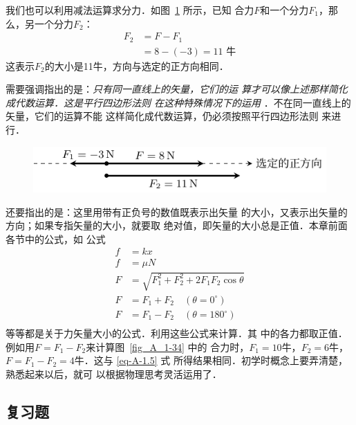     我们也可以利用减法运算求分力．如图~\ref{fig_A_1-35} 所示，已知
合力$F$和一个分力$F_1$，那么，另一个分力$F_2$：
\begin{equation} 
\begin{split} 
F_2&=F-F_1\\
&=8-(-3)=11\text{ 牛} 
\end{split} 
\end{equation} 
这表示$F_2$的大小是11牛，方向与选定的正方向相同．

需要强调指出的是：\textit{只有同一直线上的矢量，它们的运
算才可以像上述那样简化成代数运算．这是平行四边形法则
在这种特殊情况下的运用} ．不在同一直线上的矢量，它们的运算不能
这样简化成代数运算，仍必须按照平行四边形法则
来进行．

\begin{figure} [htp]
\centering
\includegraphics{fig/A/1-35.pdf} 
\caption{} \label{fig_A_1-35} 
\end{figure} 

    还要指出的是：这里用带有正负号的数值既表示出矢量
的大小，又表示出矢量的方向；如果专指矢量的大小，就要取
绝对值，即矢量的大小总是正值．本章前面各节中的公式，如
公式
\[\begin{split} 
f&=kx\\
f&=\mu N\\
F&=\sqrt{F^2_1+F^2_2+2F_1F_2\cos\theta} \\
F&=F_1+F_2\quad (\theta =0^\circ)\\
F&=F_1-F_2\quad (\theta =180^\circ)\\
\end{split}  \]
等等都是关于力矢量大小的公式．利用这些公式来计算．其
中的各力都取正值．例如用$F=F_1-F_2$来计算图~\ref{fig_A_1-34} 中的
合力时，$F_1=10$牛，$F_2=6$牛，$F=F_1-F_2=4$牛．这与 \eqref{eq-A-1.5} 式
所得结果相同．初学时概念上要弄清楚，熟悉起来以后，就可
以根据物理思考灵活运用了．


\subsection*{复习题} 

